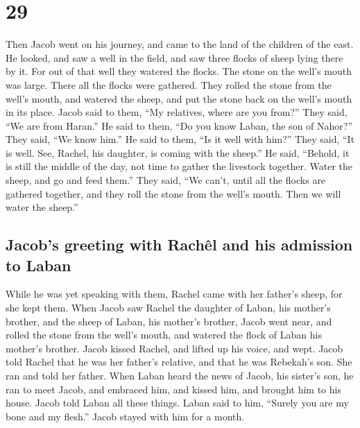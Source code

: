 \hypertarget{section-28}{%
\section{29}\label{section-28}}

 Then Jacob went on his journey, and came to the land of
the children of the east.  He looked, and saw a well in
the field, and saw three flocks of sheep lying there by it. For out of
that well they watered the flocks. The stone on the well's mouth was
large.  There all the flocks were gathered. They rolled
the stone from the well's mouth, and watered the sheep, and put the
stone back on the well's mouth in its place.  Jacob said
to them, ``My relatives, where are you from?'' They said, ``We are from
Haran.''  He said to them, ``Do you know Laban, the son of
Nahor?'' They said, ``We know him.''  He said to them,
``Is it well with him?'' They said, ``It is well. See, Rachel, his
daughter, is coming with the sheep.''  He said, ``Behold,
it is still the middle of the day, not time to gather the livestock
together. Water the sheep, and go and feed them.''  They
said, ``We can't, until all the flocks are gathered together, and they
roll the stone from the well's mouth. Then we will water the sheep.''

\hypertarget{jacobs-greeting-with-rachuxeal-and-his-admission-to-laban}{%
\subsection{Jacob's greeting with Rachêl and his admission to
Laban}\label{jacobs-greeting-with-rachuxeal-and-his-admission-to-laban}}

 While he was yet speaking with them, Rachel came with her
father's sheep, for she kept them.  When Jacob saw Rachel
the daughter of Laban, his mother's brother, and the sheep of Laban, his
mother's brother, Jacob went near, and rolled the stone from the well's
mouth, and watered the flock of Laban his mother's brother.
 Jacob kissed Rachel, and lifted up his voice, and wept.
 Jacob told Rachel that he was her father's relative, and
that he was Rebekah's son. She ran and told her father. 
When Laban heard the news of Jacob, his sister's son, he ran to meet
Jacob, and embraced him, and kissed him, and brought him to his house.
Jacob told Laban all these things.  Laban said to him,
``Surely you are my bone and my flesh.'' Jacob stayed with him for a
month.

